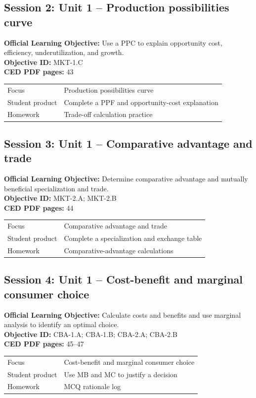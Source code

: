 \documentclass[11pt,a4paper]{article}
\newcommand{\objectivebox}[1]{\noindent\colorbox{aplight}{\parbox{0.96\textwidth}{#1}}}
\begin{document}
\subsection{Session 2: Unit 1 -- Production possibilities curve}
\objectivebox{\textbf{Official Learning Objective:} Use a PPC to explain opportunity cost, efficiency, underutilization, and growth.\\\textbf{Objective ID:} MKT-1.C\\\textbf{CED PDF pages:} 43}\par\vspace{0.4em}
\begin{tabularx}{\textwidth}{p{3.0cm}Y}
\toprule
Focus & Production possibilities curve\\
Student product & Complete a PPF and opportunity-cost explanation\\
Homework & Trade-off calculation practice\\
\bottomrule
\end{tabularx}
\subsection{Session 3: Unit 1 -- Comparative advantage and trade}
\objectivebox{\textbf{Official Learning Objective:} Determine comparative advantage and mutually beneficial specialization and trade.\\\textbf{Objective ID:} MKT-2.A; MKT-2.B\\\textbf{CED PDF pages:} 44}\par\vspace{0.4em}
\begin{tabularx}{\textwidth}{p{3.0cm}Y}
\toprule
Focus & Comparative advantage and trade\\
Student product & Complete a specialization and exchange table\\
Homework & Comparative-advantage calculations\\
\bottomrule
\end{tabularx}
\subsection{Session 4: Unit 1 -- Cost-benefit and marginal consumer choice}
\objectivebox{\textbf{Official Learning Objective:} Calculate costs and benefits and use marginal analysis to identify an optimal choice.\\\textbf{Objective ID:} CBA-1.A; CBA-1.B; CBA-2.A; CBA-2.B\\\textbf{CED PDF pages:} 45–47}\par\vspace{0.4em}
\begin{tabularx}{\textwidth}{p{3.0cm}Y}
\toprule
Focus & Cost-benefit and marginal consumer choice\\
Student product & Use MB and MC to justify a decision\\
Homework & MCQ rationale log\\
\bottomrule
\end{tabularx}
\end{document}
